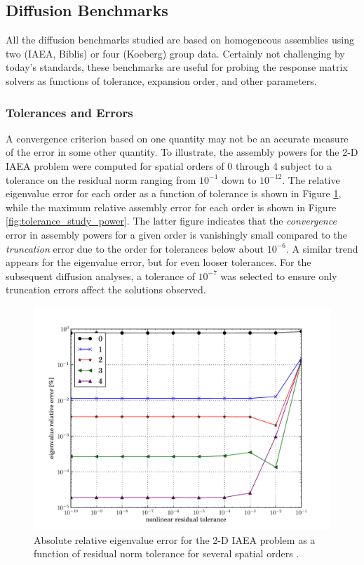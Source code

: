 \subsection{Diffusion Benchmarks}

All the diffusion benchmarks studied are based on homogeneous
assemblies using two (IAEA, Biblis) or four (Koeberg) group 
data.  Certainly not challenging by today's standards, these 
benchmarks are useful for probing the response matrix solvers
as functions of tolerance, expansion order, and other parameters.


\subsubsection{Tolerances and Errors}

A convergence criterion based on 
one quantity may not be an accurate measure of the error in some 
other quantity.  To illustrate, the assembly powers for the 2-D IAEA 
problem were computed for spatial orders of 0 through 4 subject to 
a tolerance on the residual norm ranging from $10^{-1}$ down to $10^{-12}$.
The relative eigenvalue error for each order as a function of 
tolerance is shown in Figure \ref{fig:tolerance_study_eigenvalue}, 
while the 
maximum relative assembly error for each order is shown in 
Figure \ref{fig:tolerance_study_power}.  The latter figure
indicates that the {\it convergence} error in assembly powers 
for a  given order is vanishingly small compared to 
the {\it truncation} error due to the order for tolerances
below about $10^{-6}$.  A similar trend appears for the eigenvalue 
error, but for even looser tolerances.  For the subsequent diffusion 
analyses, a tolerance of $10^{-7}$ was selected to ensure only 
truncation errors affect the solutions observed.

\begin{figure}[ht]
    \centering
    \includegraphics[keepaspectratio, width = 3.5 in]
                    {tolerance_study_eigenvalue}
    \caption{Absolute relative eigenvalue error for the 2-D IAEA 
             problem as a function of residual 
             norm tolerance for several spatial orders .}
    \label{fig:tolerance_study_eigenvalue}
\end{figure}

